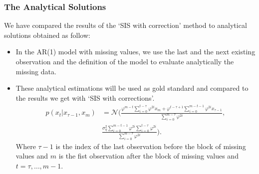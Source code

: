 \documentclass[9pt, xcolor={dvipsnames,svgnames,table}]{beamer}
\begin{document}
\begin{frame}
    \frametitle{The Analytical Solutions}
    \textcolor{PineGreen}{We have compared the results of the `SIS with correction' method to analytical solutions} obtained as follow:
    \begin{itemize}
        \item In the AR(1) model with missing values, we use the last and the next existing observation and the definition of the model to evaluate analytically the missing data.
        \item These analytical estimations will be used as gold standard and compared to the results we get with `SIS with corrections'.
        \begin{align*}
            p(x_t | x_{\tau-1}, x_{m}) &= \mathcal{N} \Bigg(\frac{\varphi^{m-t} \sum_{i=0}^{t-\tau} \varphi^{2i} x_{m} + \varphi^{t-\tau+1} \sum_{i=0}^{m-t-1} \varphi^{2i} x_{\tau-1}}{\sum_{i=0}^{m-\tau} \varphi^{2i}}, \\
            & \frac{\sigma^2_\eta \sum_{i=0}^{m-t-1} \varphi^{2i} \sum_{i=0}^{t-\tau} \varphi^{2i}}{\sum_{i=0}^{m-\tau} \varphi^{2i}} \Bigg).
        \end{align*}
        Where $\tau-1$ is the index of the last observation before the block of missing values and $m$ is the fist observation after the block of missing values and $t = \tau, \dots, m-1$.
    \end{itemize}
\end{frame}
\end{document}
